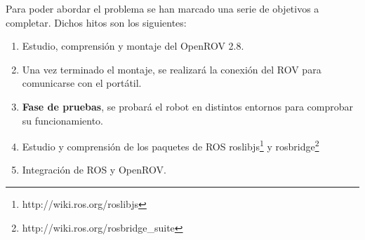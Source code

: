 Para poder abordar el problema se han marcado una serie de objetivos a completar. Dichos hitos son los siguientes:

\begin{enumerate}
\item Estudio, comprensión y montaje del OpenROV 2.8.
\item Una vez terminado el montaje, se realizará la conexión del ROV para comunicarse con el portátil.
\item \textbf{Fase de pruebas}, se probará el robot en distintos entornos para comprobar su funcionamiento.
\item Estudio y comprensión de los paquetes de ROS roslibjs\footnote{http://wiki.ros.org/roslibjs} y rosbridge\footnote{http://wiki.ros.org/rosbridge\_suite}
\item Integración de ROS y OpenROV.
\end{enumerate}